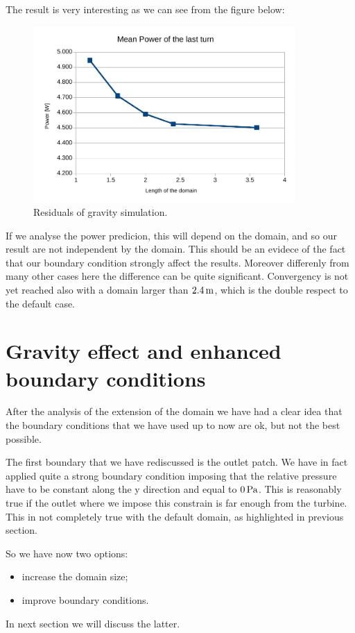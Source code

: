\documentclass[a4paper,12pt]{article}
\begin{document}
The result is very interesting as we can see from the figure below:
\begin{figure}[H]
\centering
\includegraphics[width=10cm]{images/longmesh/power.pdf}
\caption{Residuals of gravity simulation.}
\label{fig:domainlong-power}
\end{figure}
If we analyse the power predicion, this will depend on the domain, and so our result are not independent by the domain. This should be an evidece of the fact that our boundary condition strongly affect the results.
Moreover differenly from many other cases here the difference can be quite significant.
Convergency is not yet reached also with a domain larger than $2.4\,\text{m}$, which is the double respect to the default case.%

\section{Gravity effect and enhanced boundary conditions}

After the analysis of the extension of the domain we have had a clear idea that the boundary conditions that we have used up to now are ok, 
but not the best possible.

The first boundary that we have rediscussed is the outlet patch. We have in fact applied quite a strong boundary condition imposing that the relative pressure have to be constant along the y direction and equal to $0\,\text{Pa}$. This is reasonably true if the outlet where we impose this constrain is far enough from the turbine. This in not completely true with the default domain, as highlighted in previous section.

So we have now two options:
\begin{itemize}
\item increase the domain size;
\item improve boundary conditions.
\end{itemize}  
In next section we will discuss the latter.
\end{document}
